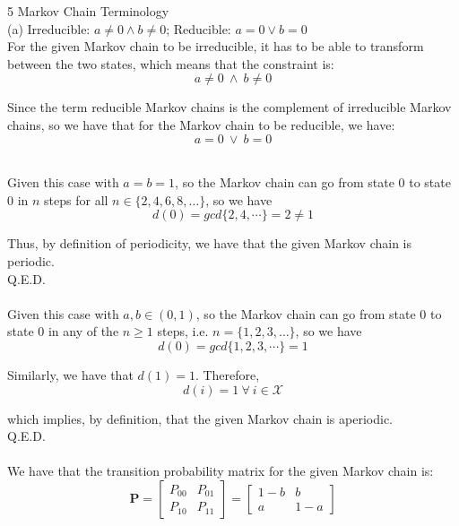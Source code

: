 \documentclass{article}
\begin{document}
{\Large 5 Markov Chain Terminology} \\[.5cm]
{\color{red} (a)
Irreducible: $a\neq 0 \land b\neq 0$;
Reducible: $a = 0 \lor b = 0$ } \\

For the given Markov chain to be irreducible, it has to be able to transform between the two states, which means that the constraint is:
$$a\neq 0\ \land\ b\neq 0$$

Since the term reducible Markov chains is the complement of irreducible Markov chains, so we have that for the Markov chain to be reducible, we have:
$$a = 0\ \lor\ b = 0$$



 \\

Given this case with $a = b = 1$, so the Markov chain can go from state 0 to state 0 in $n$ steps for all $n\in \{2,4,6,8,\dots\}$, so we have
$$d(0) = gcd\{2,4,\cdots\} = 2 \neq 1$$

Thus, by definition of periodicity, we have that the given Markov chain is periodic. \\

Q.E.D. \\



 \\

Given this case with $a, b \in (0,1)$, so the Markov chain can go from state 0 to state 0 in any of the $n\geq1$ steps, i.e. $n = \{1,2,3,\dots\}$, so we have
$$d(0) = gcd\{1,2,3,\cdots\} = 1$$

Similarly, we have that $d(1) = 1$. Therefore,
$$d(i) = 1\ \forall\ i\in\mathscr{X}$$

which implies, by definition, that the given Markov chain is aperiodic. \\

Q.E.D. \\



 \\

We have that the transition probability matrix for the given Markov chain is:
$$ \mathbf{P} =
\begin{bmatrix}
	P_{00} & P_{01} \\
	P_{10} & P_{11}
\end{bmatrix} =
\begin{bmatrix}
	1-b & b \\
	a & 1-a
\end{bmatrix} $$ 
\end{document}
